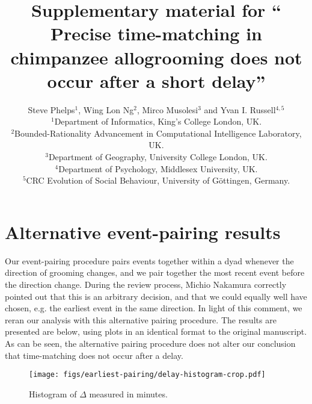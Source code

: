 \documentclass[12pt]{article}
\begin{document}
\linenumbers

\baselineskip24pt

\author{%
Steve Phelps$^{1}$, Wing Lon Ng$^{2}$, Mirco Musolesi$^{3}$ and Yvan I. Russell$^{4,5}$\\
\normalsize{$^{1}$Department of Informatics, King's College London, UK.}\\
\normalsize{$^{2}$Bounded-Rationality Advancement in Computational Intelligence Laboratory, UK.}\\
\normalsize{$^{3}$Department of Geography, University College London, UK.}\\
\normalsize{$^{4}$Department of Psychology, Middlesex University, UK.} \\
\normalsize{$^{5}$CRC Evolution of Social Behaviour, University of G\"{o}ttingen, Germany.}
}
% 
% 
% 
% 
\title{Supplementary material for ``
Precise time-matching in chimpanzee allogrooming does not occur after a short delay''}

\section{Alternative event-pairing results}

Our event-pairing procedure pairs events together within a dyad whenever the 
direction of grooming changes, and we pair together the most recent event before 
the direction change.  During the review process, Michio Nakamura correctly 
pointed out that this is an arbitrary decision, and that we could equally well 
have chosen, e.g. the earliest event in the same direction.  In light of this comment,
we reran our analysis with this alternative pairing procedure.  The results
are presented are below, using plots in an identical format to the original 
manuscript.  As can be seen, the alternative pairing procedure does not
alter our conclusion that time-matching does not occur after a delay.

\begin{figure*}
 \begin{center}
  \texttt{[image: figs/earliest-pairing/delay-histogram-crop.pdf]}
  \caption{Histogram of $\Delta$ measured in 
minutes.\label{fig:delay-histogram}}
 \end{center}
\end{figure*}
\end{document}
